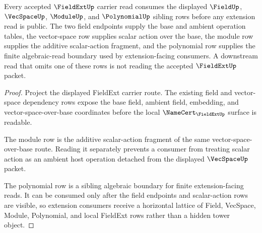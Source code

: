 \begin{theorem}
\label{thm:fieldext-sibling-dependency-route}
Every accepted $\FieldExtUp$ carrier read consumes the displayed $\FieldUp$, $\VecSpaceUp$, $\ModuleUp$, and $\PolynomialUp$ sibling rows before any extension read is public. The two field endpoints supply the base and ambient operation tables, the vector-space row supplies scalar action over the base, the module row supplies the additive scalar-action fragment, and the polynomial row supplies the finite algebraic-read boundary used by extension-facing consumers. A downstream read that omits one of these rows is not reading the accepted $\FieldExtUp$ packet.
\end{theorem}
\begin{proof}
Project the displayed FieldExt carrier route. The existing field and vector-space dependency rows expose the base field, ambient field, embedding, and vector-space-over-base coordinates before the local $\NameCert_{\FieldExtUp}$ surface is readable.

The module row is the additive scalar-action fragment of the same vector-space-over-base route. Reading it separately prevents a consumer from treating scalar action as an ambient host operation detached from the displayed $\VecSpaceUp$ packet.

The polynomial row is a sibling algebraic boundary for finite extension-facing reads. It can be consumed only after the field endpoints and scalar-action rows are visible, so extension consumers receive a horizontal lattice of Field, VecSpace, Module, Polynomial, and local FieldExt rows rather than a hidden tower object.
\end{proof}
